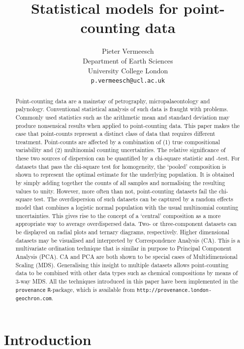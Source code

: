 \documentclass{article}
\title{Statistical models for point-counting data}
\author{Pieter Vermeesch\\Department of Earth Sciences\\
  University College London\\\texttt{p.vermeesch@ucl.ac.uk}
}
\begin{document}
\linenumbers
\doublespacing

\maketitle

\begin{abstract}
  Point-counting data are a mainstay of petrography,
  micropalaeontology and palynology.  Conventional statistical
  analysis of such data is fraught with problems. Commonly used
  statistics such as the arithmetic mean and standard deviation may
  produce nonsensical results when applied to point-counting data.
  This paper makes the case that point-counts represent a distinct
  class of data that requires different treatment. Point-counts are
  affected by a combination of (1) true compositional variability and
  (2) multinomial counting uncertainties. The relative significance of
  these two sources of dispersion can be quantified by a chi-square
  statistic and -test.  For datasets that pass the chi-square test for
  homogeneity, the `pooled' composition is shown to represent the
  optimal estimate for the underlying population. It is obtained by
  simply adding together the counts of all samples and normalising the
  resulting values to unity. However, more often than not,
  point-counting datasets fail the chi-square test. The overdispersion
  of such datasets can be captured by a random effects model that
  combines a logistic normal population with the usual multinomial
  counting uncertainties.  This gives rise to the concept of a
  `central' composition as a more appropriate way to average
  overdispersed data.  Two- or three-component datasets can be
  displayed on radial plots and ternary diagrams, respectively. Higher
  dimensional datasets may be visualised and interpreted by
  Correspondence Analysis (CA). This is a multivariate ordination
  technique that is similar in purpose to Principal Component Analysis
  (PCA). CA and PCA are both shown to be special cases of
  Multidimensional Scaling (MDS). Generalising this insight to
  multiple datasets allows point-counting data to be combined with
  other data types such as chemical compositions by means of 3-way
  MDS.  All the techniques introduced in this paper have been
  implemented in the \texttt{provenance} \texttt{R}-package, which is
  available from \texttt{http://provenance.london-geochron.com}.
\end{abstract}

\section{Introduction}
\label{sec:intro}
\end{document}
